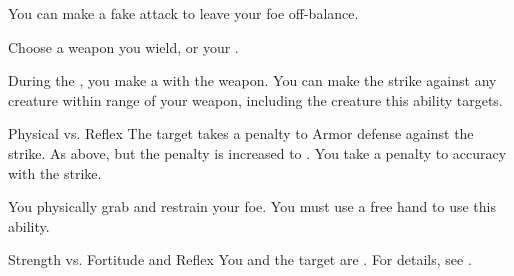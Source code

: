             \label{Feint} You can make a fake attack to leave your foe off-balance.
            \begin{ability}
                \begin{spelltargetinginfo}
                    \spellspecial Choose a weapon you wield, or your .
                \end{spelltargetinginfo}
                \begin{spelleffects}
                    \spelleffect During the , you make a  with the weapon.
                    You can make the strike against any creature within range of your weapon, including the creature this ability targets.
                    \begin{spellattack}{Physical vs. Reflex}
                        \spellsuccess The target takes a  penalty to Armor defense against the strike.
                        \spellcritical As above, but the penalty is increased to .
                        \spellfailure You take a  penalty to accuracy with the strike.
                    \end{spellattack}
                \end{spelleffects}
            \end{ability}

            \label{Grapple} You physically grab and restrain your foe.
            You must use a free hand to use this ability.
            \begin{ability}
                \begin{spelltargetinginfo}
                \end{spelltargetinginfo}
                \begin{spelleffects}
                    \begin{spellattack}{Strength vs. Fortitude and Reflex}
                        \spellsuccess You and the target are \grappled.
                        For details, see .
                    \end{spellattack}
                \end{spelleffects}
            \end{ability}

